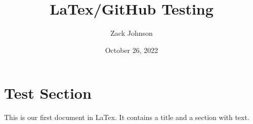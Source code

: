 \documentclass[a4paper, 12pt]{article}
\title{LaTex/GitHub Testing}
\author{Zack Johnson}
\date{October 26, 2022}
\begin{document}
\maketitle
\section{Test Section}
This is our first document in LaTex. It contains a title and a section with text.
\end{document}
